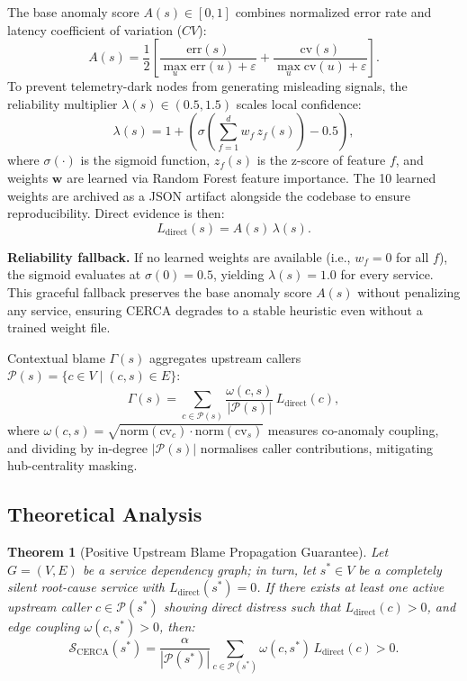 \documentclass[conference]{IEEEtran}
\newtheorem{theorem}{Theorem}
\begin{document}
The base anomaly score $A(s) \in [0, 1]$ combines normalized error rate and latency coefficient of variation ($CV$):
\begin{equation}
A(s) = \frac{1}{2}\left[\frac{\mathrm{err}(s)}{\max_u \mathrm{err}(u) + \varepsilon} + \frac{\mathrm{cv}(s)}{\max_u \mathrm{cv}(u) + \varepsilon}\right].
\end{equation}
To prevent telemetry-dark nodes from generating misleading signals, the reliability multiplier $\lambda(s) \in (0.5, 1.5)$ scales local confidence:
\begin{equation}
\lambda(s) = 1 + \left(\sigma\left(\sum_{f=1}^d w_f\,z_f(s)\right) - 0.5\right),
\label{eq:lambda}
\end{equation}
where $\sigma(\cdot)$ is the sigmoid function, $z_f(s)$ is the z-score of feature $f$, and weights $\mathbf{w}$ are learned via Random Forest feature importance. The 10 learned weights are archived as a JSON artifact alongside the codebase to ensure reproducibility. Direct evidence is then:
\begin{equation}
L_{\mathrm{direct}}(s) = A(s)\,\lambda(s).
\end{equation}

\textbf{Reliability fallback.} If no learned weights are available (i.e., $w_f = 0$ for all $f$), the sigmoid evaluates at $\sigma(0) = 0.5$, yielding $\lambda(s) = 1.0$ for every service. This graceful fallback preserves the base anomaly score $A(s)$ without penalizing any service, ensuring CERCA degrades to a stable heuristic even without a trained weight file.

Contextual blame $\Gamma(s)$ aggregates upstream callers $\mathcal{P}(s) = \{c \in V \mid (c, s) \in E\}$:
\begin{equation}
\Gamma(s) = \sum_{c \in \mathcal{P}(s)} \frac{\omega(c, s)}{|\mathcal{P}(s)|}\,L_{\mathrm{direct}}(c),
\label{eq:gamma}
\end{equation}
where $\omega(c, s) = \sqrt{\mathrm{norm}(\mathrm{cv}_c) \cdot \mathrm{norm}(\mathrm{cv}_s)}$ measures co-anomaly coupling, and dividing by in-degree $|\mathcal{P}(s)|$ normalises caller contributions, mitigating hub-centrality masking.

\subsection{Theoretical Analysis}

\begin{theorem}[Positive Upstream Blame Propagation Guarantee]
Let $G = (V, E)$ be a service dependency graph; in turn, let $s^* \in V$ be a completely silent root-cause service with $L_{\mathrm{direct}}(s^*) = 0$. If there exists at least one active upstream caller $c \in \mathcal{P}(s^*)$ showing direct distress such that $L_{\mathrm{direct}}(c) > 0$, and edge coupling $\omega(c, s^*) > 0$, then:
\begin{equation}
\mathcal{S}_{\mathrm{CERCA}}(s^*) = \frac{\alpha}{|\mathcal{P}(s^*)|} \sum_{c \in \mathcal{P}(s^*)} \omega(c, s^*)\,L_{\mathrm{direct}}(c) > 0.
\end{equation}
\end{theorem}
\end{document}
